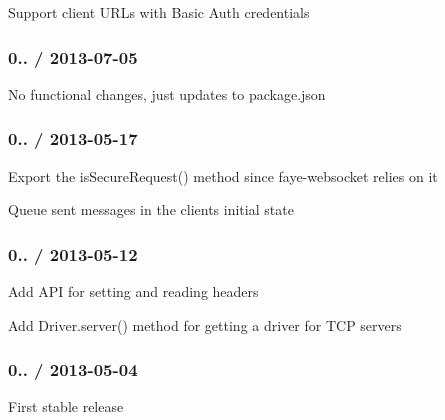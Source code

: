 \begin{DoxyItemize}
\item Support client U\+R\+Ls with Basic Auth credentials
\end{DoxyItemize}

\subsubsection*{0.. / 2013-\/07-\/05}


\begin{DoxyItemize}
\item No functional changes, just updates to package.\+json
\end{DoxyItemize}

\subsubsection*{0.. / 2013-\/05-\/17}


\begin{DoxyItemize}
\item Export the is\+Secure\+Request() method since faye-\/websocket relies on it
\item Queue sent messages in the client\textquotesingle{}s initial state
\end{DoxyItemize}

\subsubsection*{0.. / 2013-\/05-\/12}


\begin{DoxyItemize}
\item Add A\+PI for setting and reading headers
\item Add Driver.\+server() method for getting a driver for T\+CP servers
\end{DoxyItemize}

\subsubsection*{0.. / 2013-\/05-\/04}


\begin{DoxyItemize}
\item First stable release 
\end{DoxyItemize}